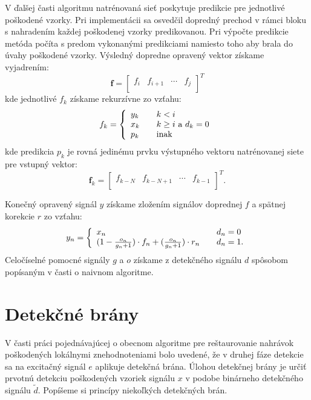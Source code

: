 V ďalšej časti algoritmu natrénovaná sieť poskytuje predikcie pre jednotlivé poškodené vzorky. Pri implementácii sa osvedčil dopredný prechod v rámci bloku s nahradením každej poškodenej vzorky predikovanou. Pri výpočte predikcie metóda počíta s predom vykonanými predikciami namiesto toho aby brala do úvahy poškodené vzorky. Výsledný dopredne opravený vektor získame vyjadrením:
$$\mathbf{f}=\begin{bmatrix} 
  f_i & f_{i+1} & \cdots & f_{j}\\
\end{bmatrix}^T$$ 
kde jednotlivé $f_k$ získame rekurzívne zo vzťahu:
$$f_k = \left\{\begin{array}{l l}
	y_k & \quad \text{$k<i$}\\
	x_k & \quad \text{$k\geq i$ a $d_k=0$}\\
	p_k & \quad \text{inak}\\
\end{array} \right.$$
kde predikcia $p_k$ je rovná jedinému prvku výstupného vektoru natrénovanej siete pre vstupný vektor:
$$\mathbf{f}_k=\begin{bmatrix} 
f_{k-N} & f_{k-N+1} & \cdots & f_{k-1}\\ 
\end{bmatrix}^T.$$

Konečný opravený signál $y$ získame zložením signálov doprednej $f$ a spätnej korekcie $r$ zo vzťahu:
$$y_n = \left\{\begin{array}{l l}
	x_n & \quad d_n = 0\\
	(1-\frac{o_n}{g_n+1}) \cdot f_n + (\frac{o_n}{g_n+1}) \cdot r_n & \quad d_n=1.\\
\end{array} \right.$$
Celočíselné pomocné signály $g$ a $o$ získame z detekčného signálu $d$ spôsobom popísaným v časti o naivnom algoritme.

\section{Detekčné brány}
V časti práci pojednávajúcej o obecnom algoritme pre reštaurovanie nahrávok poškodených lokálnymi znehodnoteniami bolo uvedené, že v druhej fáze detekcie sa na excitačný signál $e$ aplikuje detekčná brána. Úlohou detekčnej brány je určiť prvotnú detekciu poškodených vzoriek signálu $x$ v podobe binárneho detekčného signálu $\tilde{d}$. Popíšeme si princípy niekoľkých detekčných brán.

